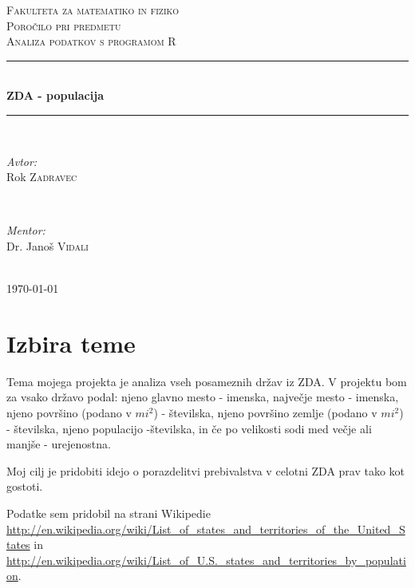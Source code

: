 \documentclass[11pt,a4paper]{article}
\begin{document}
\begin{titlepage}
\newcommand{\HRule}{\rule{\linewidth}{0.5mm}}
\center

\textsc{\LARGE Fakulteta za matematiko in fiziko}\\[3 cm]
\textsc{\Large Poročilo pri predmetu}\\[0.5cm]
\textsc{\large Analiza podatkov s programom R}\\[2 cm]
\HRule \\[0.4cm]
{ \huge \bfseries ZDA - populacija}\\[0.4cm] 
\HRule \\[6 cm]


\begin{minipage}{0.4\textwidth}
\begin{flushleft} \large
\emph{Avtor:}\\
Rok \textsc{Zadravec}
\end{flushleft}
\end{minipage}
~
\begin{minipage}{0.4\textwidth}
\begin{flushright} \large
\emph{Mentor:} \\
Dr. Janoš \textsc{Vidali}
\end{flushright}
\end{minipage}\\[2 cm]

{\large \today}\\[3cm] 


\end{titlepage}

\section{Izbira teme}

Tema mojega projekta je analiza vseh posameznih držav iz ZDA. V projektu bom za vsako državo podal: njeno glavno mesto - imenska, največje mesto - imenska, njeno površino (podano v $mi^2$) - številska, njeno površino zemlje (podano v $mi^2$) - številska, njeno populacijo -številska, in če po velikosti sodi med večje ali manjše - urejenostna.

Moj cilj je pridobiti idejo o porazdelitvi prebivalstva v celotni ZDA prav tako kot gostoti.

Podatke sem pridobil na strani Wikipedie \url{http://en.wikipedia.org/wiki/List_of_states_and_territories_of_the_United_States} in \url{http://en.wikipedia.org/wiki/List_of_U.S._states_and_territories_by_population}.
\end{document}
